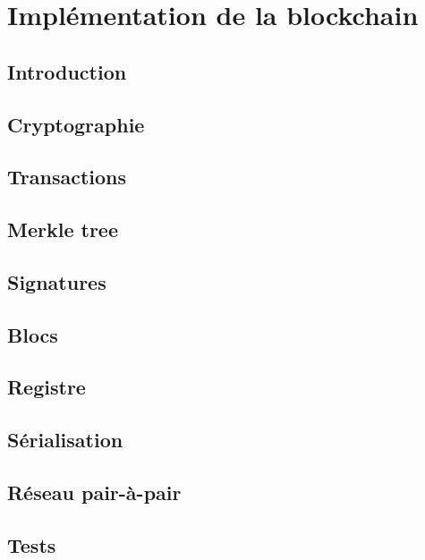 \chapter{Implémentation de la blockchain}
\label{ch:realisation}

\section{Introduction}

\lipsum[1]

\section{Cryptographie}

\lipsum[2]

\section{Transactions}

\lipsum[3]

\section{Merkle tree}

\lipsum[4]

\section{Signatures}

\lipsum[5]

\section{Blocs}

\lipsum[6]

\section{Registre}

\lipsum[7]

\section{Sérialisation}

\lipsum[8]

\section{Réseau pair-à-pair}

\lipsum[9]

\section{Tests}

\lipsum[10]